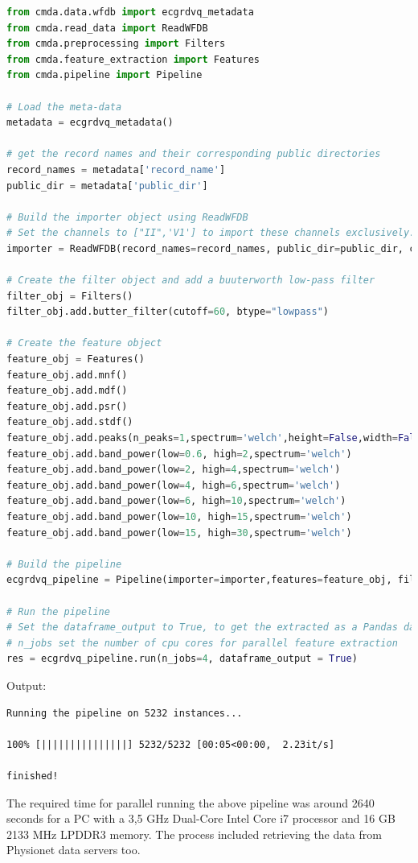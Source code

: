 \documentclass{article}
\begin{document}
\begin{lstlisting}[language=Python, caption=Multivariate feature extraction using one feature object]
from cmda.data.wfdb import ecgrdvq_metadata
from cmda.read_data import ReadWFDB
from cmda.preprocessing import Filters
from cmda.feature_extraction import Features
from cmda.pipeline import Pipeline

# Load the meta-data
metadata = ecgrdvq_metadata()

# get the record names and their corresponding public directories
record_names = metadata['record_name']
public_dir = metadata['public_dir']

# Build the importer object using ReadWFDB 
# Set the channels to ["II",'V1'] to import these channels exclusively. 
importer = ReadWFDB(record_names=record_names, public_dir=public_dir, channels=['II','V1'])

# Create the filter object and add a buuterworth low-pass filter
filter_obj = Filters()
filter_obj.add.butter_filter(cutoff=60, btype="lowpass")

# Create the feature object
feature_obj = Features()
feature_obj.add.mnf()
feature_obj.add.mdf()
feature_obj.add.psr()
feature_obj.add.stdf()
feature_obj.add.peaks(n_peaks=1,spectrum='welch',height=False,width=False,nperseg=512)
feature_obj.add.band_power(low=0.6, high=2,spectrum='welch')
feature_obj.add.band_power(low=2, high=4,spectrum='welch')
feature_obj.add.band_power(low=4, high=6,spectrum='welch')
feature_obj.add.band_power(low=6, high=10,spectrum='welch')
feature_obj.add.band_power(low=10, high=15,spectrum='welch')
feature_obj.add.band_power(low=15, high=30,spectrum='welch')

# Build the pipeline
ecgrdvq_pipeline = Pipeline(importer=importer,features=feature_obj, filters=filter_obj)

# Run the pipeline
# Set the dataframe_output to True, to get the extracted as a Pandas dataframe
# n_jobs set the number of cpu cores for parallel feature extraction
res = ecgrdvq_pipeline.run(n_jobs=4, dataframe_output = True)
\end{lstlisting}

Output:
\begin{lstlisting}
Running the pipeline on 5232 instances...

100% [|||||||||||||||] 5232/5232 [00:05<00:00,  2.23it/s]

finished!
\end{lstlisting}

The required time for parallel running the above pipeline was around 2640 seconds for a PC with a 3,5 GHz Dual-Core Intel Core i7 processor and 16 GB 2133 MHz LPDDR3 memory. The process included retrieving the data from Physionet data servers too.
\end{document}
